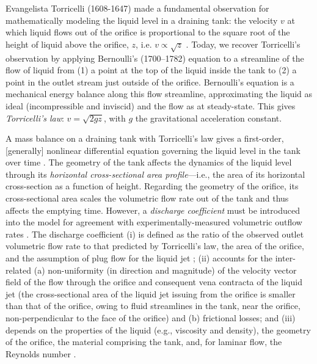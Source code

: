 \documentclass[a4paper,fleqn]{cas-dc}
\begin{document}
Evangelista Torricelli (1608-1647) made a fundamental observation for mathematically modeling the liquid level in a draining tank: 
the velocity $v$ at which liquid flows out of the orifice is proportional to the square root of the height of liquid above the orifice, $z$, i.e. $v\propto \sqrt{z}$ \cite{mills1982newton,dorfman1958life}.
Today, we recover Torricelli's observation by applying Bernoulli's (1700–1782) equation \cite{welty2020fundamentals} to a streamline of the flow of liquid from (1) a point at the top of the liquid inside the tank to (2) a point in the outlet stream just outside of the orifice. 
Bernoulli's equation is a mechanical energy balance along this flow streamline, approximating the liquid as ideal (incompressible and inviscid) and the flow as at steady-state. 
This gives \emph{Torricelli's law}: $v=\sqrt{2 g z}$, with $g$ the gravitational acceleration constant. \cite{d2021torricelli,teoman2022discharge}

A mass balance on a draining tank with Torricelli's law gives a first-order, [generally] nonlinear differential equation governing the liquid level in the tank over time \cite{groetsch1993inverse_tl,seborg2016process,debook}.
The geometry of the tank affects the dynamics of the liquid level through its \emph{horizontal cross-sectional area profile}---i.e., the area of its horizontal cross-section as a function of height.
Regarding the geometry of the orifice, its cross-sectional area scales the volumetric flow rate out of the tank and thus affects the emptying time.
However, a \emph{discharge coefficient} \cite{de2000pin,blasone2015discharge,wadhwa2021study,liu2008drainage} must be introduced into the model for agreement with experimentally-measured volumetric outflow rates \cite{farmer1992physical,driver1998torricelli,brady2009siphons,rother2024modelling,paldy1963apparatus,ivanov2014testing,williams2021vessel,pavesi2019investigating,planinvsivc2011holes,saleta2005experimental,lopac2015water,powell2012carrying,maranni2021exploring}.
The discharge coefficient \cite{teoman2022discharge,hicks2014determining,blasone2015discharge,lienhard1984velocity,wadhwa2021study}
(i) is defined as the ratio of the observed outlet volumetric flow rate to that predicted by Torricelli's law, the area of the orifice, and the assumption of plug flow for the liquid jet \cite{hicks2014determining};
(ii) accounts for the inter-related
   (a) non-uniformity (in direction and magnitude) of the velocity vector field of the flow through the orifice and consequent vena contracta of the liquid jet (the cross-sectional area of the liquid jet issuing from the orifice is smaller than that of the orifice, owing to fluid streamlines in the tank, near the orifice, non-perpendicular to the face of the orifice) \cite{horsch2020simple} and 
   (b) frictional losses; and
(iii) depends on the properties of the liquid (e.g., viscosity and density), the geometry of the orifice, the material comprising the tank, and, for laminar flow, the Reynolds number \cite{teoman2022discharge,ferrand2016wetting}. 
\end{document}
